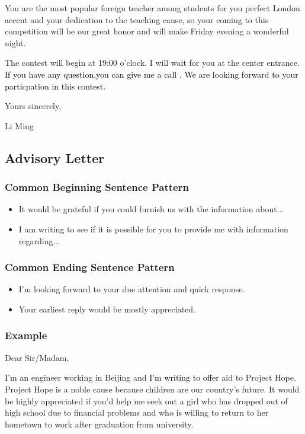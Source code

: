 \documentclass{article}
\begin{document}
\par You are the most popular foreign teacher among students for you perfect London accent
and your dedication to the teaching cause, so your coming to this competition will be our
great honor and will make Friday evening a wonderful night.

\par The contest will begin at 19:00 o'clock. I will wait for you at the center
entrance. \textcolor{black}{If you have any question,you can give me a call . We are looking
  forward to your particpation in this contest.}

\hfill Yours sincerely,

\hfill Li Ming


\subsection{Advisory Letter}
\label{sec:letter}

\subsubsection{Common Beginning Sentence Pattern}
\label{sec:comm-begnn-sent}
\begin{itemize}
\item It would be grateful if you could furnish us with the information about...
\item I am writing to see if it is possible for you to provide me with information regarding...
\end{itemize}

\subsubsection{Common Ending Sentence Pattern}
\label{sec:comm-ending-sent-2}
\begin{itemize}
\item I'm looking forward to your due attention and quick response.
\item Your earliest reply would be mostly appreciated.
\end{itemize}

\subsubsection{Example}
\label{sec:example-2}
Dear Sir/Madam,
\par \textcolor{black}{I'm an} engineer working in Beijing and \textcolor{black}{I'm writing to
  offer} aid to Project Hope. Project Hope is a noble cause because children are our
country's future. It would be highly appreciated if you'd help me seek out a girl who has
dropped out of high school due to financial problems and who is willing to return to her
hometown to work after graduation from university.
\end{document}
